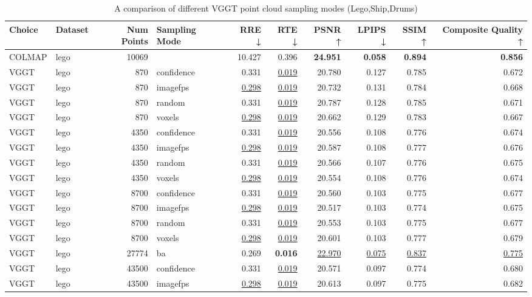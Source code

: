 \begin{table}[H]
\caption{A comparison of different VGGT point cloud sampling modes (Lego,Ship,Drums)}
\label{tab:03_sampling_mode_lego,ship,drums}
\small
\begin{tabular}{llrlrrrrrr}
\toprule
Choice & Dataset & Num Points & Sampling Mode & RRE ↓ & RTE ↓ & PSNR ↑ & LPIPS ↓ & SSIM ↑ & Composite Quality ↑ \\
\midrule
COLMAP & lego & 10069 &  & 10.427 & 0.396 & \textbf{24.951} & \textbf{0.058} & \textbf{0.894} & \textbf{0.856} \\
VGGT & lego & 870 & confidence & 0.331 & \underline{0.019} & 20.780 & 0.127 & 0.785 & 0.672 \\
VGGT & lego & 870 & imagefps & \underline{0.298} & \underline{0.019} & 20.732 & 0.131 & 0.784 & 0.668 \\
VGGT & lego & 870 & random & 0.331 & \underline{0.019} & 20.787 & 0.128 & 0.785 & 0.671 \\
VGGT & lego & 870 & voxels & \underline{0.298} & \underline{0.019} & 20.662 & 0.129 & 0.783 & 0.667 \\
VGGT & lego & 4350 & confidence & 0.331 & \underline{0.019} & 20.556 & 0.108 & 0.776 & 0.674 \\
VGGT & lego & 4350 & imagefps & \underline{0.298} & \underline{0.019} & 20.587 & 0.108 & 0.777 & 0.676 \\
VGGT & lego & 4350 & random & 0.331 & \underline{0.019} & 20.566 & 0.107 & 0.776 & 0.675 \\
VGGT & lego & 4350 & voxels & \underline{0.298} & \underline{0.019} & 20.554 & 0.108 & 0.776 & 0.674 \\
VGGT & lego & 8700 & confidence & 0.331 & \underline{0.019} & 20.560 & 0.103 & 0.775 & 0.677 \\
VGGT & lego & 8700 & imagefps & \underline{0.298} & \underline{0.019} & 20.517 & 0.103 & 0.774 & 0.675 \\
VGGT & lego & 8700 & random & 0.331 & \underline{0.019} & 20.553 & 0.103 & 0.775 & 0.677 \\
VGGT & lego & 8700 & voxels & \underline{0.298} & \underline{0.019} & 20.601 & 0.103 & 0.777 & 0.679 \\
VGGT & lego & 27774 & ba & 0.269 & \textbf{0.016} & \underline{22.970} & \underline{0.075} & \underline{0.837} & \underline{0.775} \\
VGGT & lego & 43500 & confidence & 0.331 & \underline{0.019} & 20.571 & 0.097 & 0.774 & 0.680 \\
VGGT & lego & 43500 & imagefps & \underline{0.298} & \underline{0.019} & 20.613 & 0.097 & 0.775 & 0.682 \\

\end{tabular}
\end{table}
